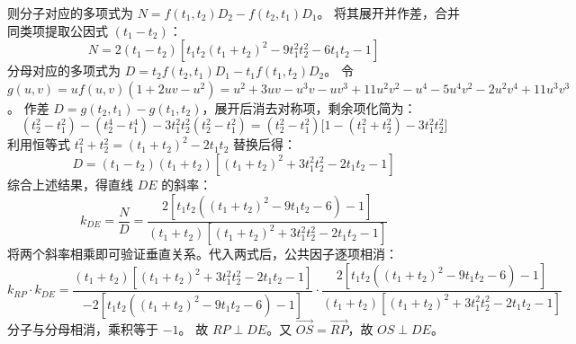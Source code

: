\begin{solution}
则分子对应的多项式为 $N = f(t_1, t_2)D_2 - f(t_2, t_1)D_1$。
将其展开并作差，合并同类项提取公因式 $(t_1 - t_2)$：
\[ N = 2(t_1-t_2) \left[ t_1 t_2 (t_1+t_2)^2 - 9t_1^2 t_2^2 - 6t_1 t_2 - 1 \right] \]
分母对应的多项式为 $D = t_2 f(t_2, t_1)D_1 - t_1 f(t_1, t_2)D_2$。
令 $g(u,v) = u f(u,v) (1+2uv-u^2) = u^2 + 3uv - u^3 v - uv^3 + 11u^2 v^2 - u^4 - 5u^4 v^2 - 2u^2 v^4 + 11u^3 v^3$。
作差 $D = g(t_2, t_1) - g(t_1, t_2)$，展开后消去对称项，剩余项化简为：
\[ (t_2^2 - t_1^2) - (t_2^4 - t_1^4) - 3t_1^2 t_2^2 (t_2^2 - t_1^2) = (t_2^2 - t_1^2) \big[ 1 - (t_1^2+t_2^2) - 3t_1^2 t_2^2 \big] \]
利用恒等式 $t_1^2 + t_2^2 = (t_1+t_2)^2 - 2t_1 t_2$ 替换后得：
\[ D = (t_1-t_2)(t_1+t_2) \left[ (t_1+t_2)^2 + 3t_1^2 t_2^2 - 2t_1 t_2 - 1 \right] \]
综合上述结果，得直线 $DE$ 的斜率：
\[ k_{DE} = \frac{N}{D} = \frac{2 \left[ t_1 t_2 ( (t_1+t_2)^2 - 9t_1 t_2 - 6 ) - 1 \right]}{(t_1+t_2) \left[ (t_1+t_2)^2 + 3t_1^2 t_2^2 - 2t_1 t_2 - 1 \right]} \]
将两个斜率相乘即可验证垂直关系。代入两式后，公共因子逐项相消：
\[ k_{RP} \cdot k_{DE} = \frac{(t_1+t_2) \left[ (t_1+t_2)^2 + 3t_1^2 t_2^2 - 2t_1 t_2 - 1 \right]}{-2 \left[ t_1 t_2 ( (t_1+t_2)^2 - 9t_1 t_2 - 6 ) - 1 \right]} \cdot \frac{2 \left[ t_1 t_2 ( (t_1+t_2)^2 - 9t_1 t_2 - 6 ) - 1 \right]}{(t_1+t_2) \left[ (t_1+t_2)^2 + 3t_1^2 t_2^2 - 2t_1 t_2 - 1 \right]} \]
分子与分母相消，乘积等于 $-1$。
故 $RP \perp DE$。又 $\overrightarrow{OS} = \overrightarrow{RP}$，故 $OS \perp DE$。
\end{solution}

